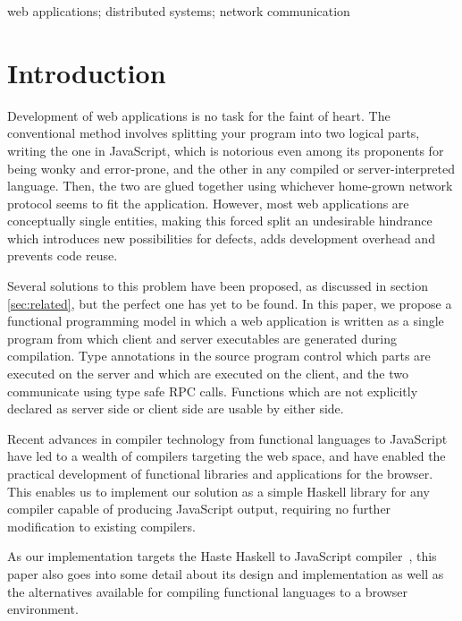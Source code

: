 \documentclass[preprint]{sigplanconf}
\begin{document}

%
\keywords
web applications; distributed systems; network communication

\section{Introduction}

Development of web applications is no task for the faint of heart.
The conventional method involves splitting your program into two logical parts,
writing the one in JavaScript, which is notorious even among its proponents for
being wonky and error-prone, and the other in any compiled or
server-interpreted language. Then, the two are glued together using whichever
home-grown network protocol seems to fit the application. However, most web
applications are conceptually single entities, making this forced split an
undesirable hindrance which introduces new possibilities for defects, adds
development overhead and prevents code reuse.

Several solutions to this problem have been proposed, as discussed in section
\ref{sec:related}, but the perfect one has yet to be found. In this paper,
we propose a functional programming model in which a web application is
written as a single program from which client and server executables are
generated during compilation. Type annotations in the source program control
which parts are executed on the server and which are executed on the client,
and the two communicate using type safe RPC calls. Functions which are not
explicitly declared as server side or client side are usable by either side.

Recent advances in compiler technology from functional languages to JavaScript
have led to a wealth of compilers targeting the web space, and have enabled the
practical development of functional libraries and applications for
the browser. This enables us to implement our solution as a simple Haskell
library for any compiler capable of producing JavaScript output, requiring no
further modification to existing compilers.

As our implementation targets the Haste Haskell to JavaScript
compiler\ \cite{haste}, this paper also goes into some detail about its design
and implementation as well as the alternatives available for compiling
functional languages to a browser environment.
\end{document}
